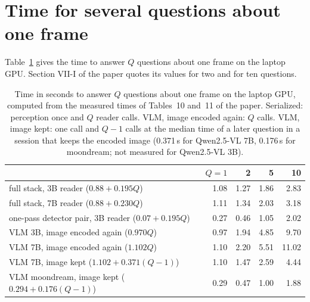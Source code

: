 \documentclass[10pt]{article}
\renewcommand{\thetable}{S\arabic{table}}
\newcommand{\settab}[1]{\setcounter{table}{#1}\addtocounter{table}{-1}\renewcommand{\thetable}{S\arabic{table}}}
\begin{document}
\section{Time for several questions about one frame}
Table~\ref{tab:s18} gives the time to answer $Q$ questions about one frame on the laptop GPU. Section VII-I of the paper quotes its values for two and for ten questions.

\settab{18}\begin{table}[h]\centering\footnotesize
\caption{Time in seconds to answer $Q$ questions about one frame on the laptop GPU, computed from the measured times of Tables~10 and~11 of the paper. Serialized: perception once and $Q$ reader calls. VLM, image encoded again: $Q$ calls. VLM, image kept: one call and $Q-1$ calls at the median time of a later question in a session that keeps the encoded image (0.371\,s for Qwen2.5-VL 7B, 0.176\,s for moondream; not measured for Qwen2.5-VL 3B).}\label{tab:s18}
\begin{tabular}{@{}lrrrr@{}}
\toprule
 & $Q{=}1$ & 2 & 5 & 10 \\ \midrule
full stack, 3B reader ($0.88+0.195Q$) & 1.08 & 1.27 & 1.86 & 2.83 \\
full stack, 7B reader ($0.88+0.230Q$) & 1.11 & 1.34 & 2.03 & 3.18 \\
one-pass detector pair, 3B reader ($0.07+0.195Q$) & 0.27 & 0.46 & 1.05 & 2.02 \\ \midrule
VLM 3B, image encoded again ($0.970Q$) & 0.97 & 1.94 & 4.85 & 9.70 \\
VLM 7B, image encoded again ($1.102Q$) & 1.10 & 2.20 & 5.51 & 11.02 \\
VLM 7B, image kept ($1.102+0.371(Q-1)$) & 1.10 & 1.47 & 2.59 & 4.44 \\
VLM moondream, image kept ($0.294+0.176(Q-1)$) & 0.29 & 0.47 & 1.00 & 1.88 \\
\bottomrule
\end{tabular}
\end{table}
\end{document}
